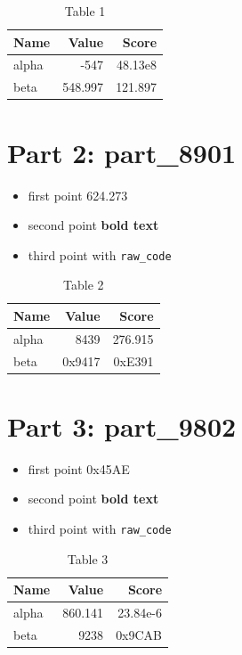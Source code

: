 \documentclass[11pt,a4paper]{article}
\begin{document}
\begin{table}[h]
  \centering
  \begin{tabular}{lrr}
    \hline
    Name & Value & Score \\ \hline
    alpha & -547 & 48.13e8 \\
    beta & 548.997 & 121.897 \\ \hline
  \end{tabular}
  \caption{Table 1}
\end{table}

\section{Part 2: part_8901}

\begin{itemize}
  \item first point 624.273
  \item second point \textbf{bold text}
  \item third point with \verb|raw_code|
\end{itemize}

\begin{table}[h]
  \centering
  \begin{tabular}{lrr}
    \hline
    Name & Value & Score \\ \hline
    alpha & 8439 & 276.915 \\
    beta & 0x9417 & 0xE391 \\ \hline
  \end{tabular}
  \caption{Table 2}
\end{table}

\section{Part 3: part_9802}

\begin{itemize}
  \item first point 0x45AE
  \item second point \textbf{bold text}
  \item third point with \verb|raw_code|
\end{itemize}

\begin{table}[h]
  \centering
  \begin{tabular}{lrr}
    \hline
    Name & Value & Score \\ \hline
    alpha & 860.141 & 23.84e-6 \\
    beta & 9238 & 0x9CAB \\ \hline
  \end{tabular}
  \caption{Table 3}
\end{table}
\end{document}
